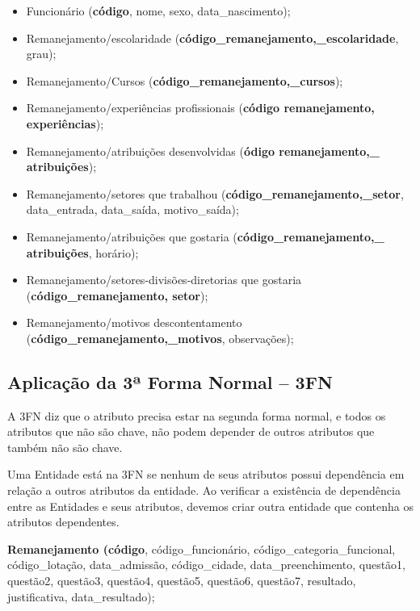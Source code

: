 \documentclass{article}
\begin{document}
\begin{itemize}
    \item Funcionário (\textbf{código}, nome, sexo, data\_nascimento);
    \item Remanejamento/escolaridade (\textbf{código_remanejamento,_escolaridade}, grau);
    \item Remanejamento/Cursos (\textbf{código_remanejamento,_cursos});
    \item Remanejamento/experiências profissionais (\textbf{código remanejamento, experiências});
    \item Remanejamento/atribuições desenvolvidas (\textbf{ódigo remanejamento,_ atribuições});
    \item Remanejamento/setores que trabalhou (\textbf{código_remanejamento,_setor}, data\_entrada, data\_saída, motivo\_saída);
    \item Remanejamento/atribuições que gostaria (\textbf{código_remanejamento,_ atribuições}, horário);
    \item Remanejamento/setores-divisões-diretorias que gostaria (\textbf{código_remanejamento, setor});
    \item Remanejamento/motivos descontentamento (\textbf{código_remanejamento,_motivos}, observações);
\end{itemize}

\subsection*{Aplicação da 3ª Forma Normal – 3FN}
A 3FN diz que o atributo precisa estar na segunda forma normal, e todos os atributos que não são chave, não podem depender de outros atributos que também não são chave.

Uma Entidade está na 3FN se nenhum de seus atributos possui dependência em relação a outros atributos da entidade. Ao verificar a existência de dependência entre as Entidades e seus atributos, devemos criar outra entidade que contenha os atributos dependentes.

\textbf{Remanejamento (código}, código\_funcionário, código\_categoria\_funcional, código\_lotação, data\_admissão, código\_cidade, data\_preenchimento, questão1, questão2, questão3, questão4, questão5, questão6, questão7, resultado, justificativa, data\_resultado);
\end{document}
